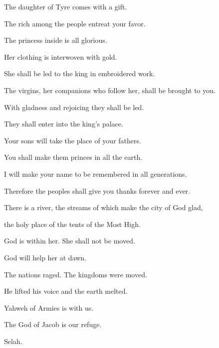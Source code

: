 {\par }{\Q {}The daughter of Tyre comes with a gift.
\par }{\QB The rich among the people entreat your favor.
\par }{\Q {}The princess inside is all glorious.
\par }{\QB Her clothing is interwoven with gold.
\par }{\Q {}She shall be led to the king in embroidered work.
\par }{\QB The virgins, her companions who follow her, shall be brought to you.
\par }{\Q {}With gladness and rejoicing they shall be led.
\par }{\QB They shall enter into the king’s palace.
\par }{\Q {}Your sons will take the place of your fathers.
\par }{\QB You shall make them princes in all the earth.
\par }{\Q {}I will make your name to be remembered in all generations.
\par }{\QB Therefore the peoples shall give you thanks forever and ever.

\par }
{\BB \par }{\Q {}There is a river, the streams of which make the city of God glad,
\par }{\QB the holy place of the tents of the Most High.
\par }{\Q {}God is within her. She shall not be moved.
\par }{\QB God will help her at dawn.
\par }{\Q {}The nations raged. The kingdoms were moved.
\par }{\QB He lifted his voice and the earth melted.
\par }{\Q {}Yahweh of Armies is with us.
\par }{\QB The God of Jacob is our refuge.
\par }{\QS Selah.\par }
